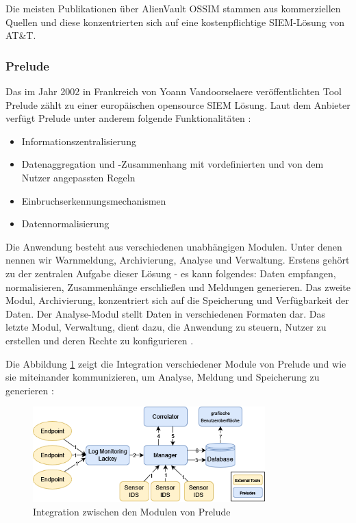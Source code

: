 
Die meisten Publikationen über AlienVault OSSIM stammen aus kommerziellen Quellen und diese konzentrierten sich auf eine kostenpflichtige \gls{SIEM}-Lösung von AT\&T.

\subsubsection{Prelude}
Das im Jahr 2002 in Frankreich von Yoann Vandoorselaere veröffentlichten Tool Prelude zählt zu einer europäischen \gls{opensource} \gls{SIEM} Lösung. Laut dem Anbieter verfügt Prelude unter anderem folgende Funktionalitäten \citep{Prelude_SIEM}:

\begin{itemize}[noitemsep]
   \item	Informationszentralisierung
   \item	Datenaggregation und -Zusammenhang mit vordefinierten und von dem Nutzer angepassten Regeln
   \item	Einbruchserkennungsmechanismen
   \item	Datennormalisierung
\end{itemize}

Die Anwendung besteht aus verschiedenen unabhängigen Modulen. Unter denen nennen wir Warnmeldung, Archivierung, Analyse und Verwaltung. Erstens gehört zu der zentralen Aufgabe dieser Lösung - es kann folgendes: Daten empfangen, normalisieren, Zusammenhänge erschließen und Meldungen generieren. Das zweite Modul, Archivierung, konzentriert sich auf die Speicherung und Verfügbarkeit der Daten. Der Analyse-Modul stellt Daten in verschiedenen Formaten dar. Das letzte Modul, Verwaltung, dient dazu, die Anwendung zu steuern, Nutzer zu erstellen und deren Rechte zu konfigurieren \citep{EC_Prelude}.

Die Abbildung \ref{fig:Module_preludes} zeigt die Integration verschiedener Module von Prelude und wie sie miteinander kommunizieren, um Analyse, Meldung und Speicherung zu generieren \citep{Prelude_MU}:

\begin{figure}[H]
   \centering
   \includegraphics[width=0.8\textwidth]{assets/Prelude_module.drawio.png}
   \caption[Integration zwischen den Modulen von Prelude ]
   {Integration zwischen den Modulen von Prelude }
   \label{fig:Module_preludes}
   \centering
\end{figure}

